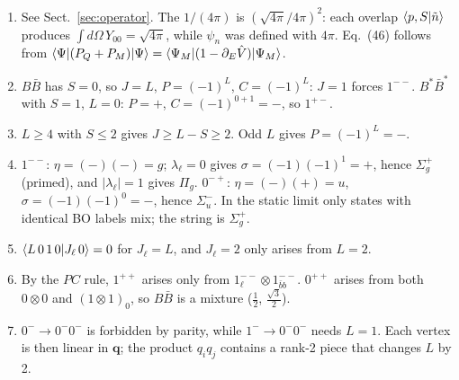 \documentclass[11pt,a4paper]{article}
\begin{document}
\begin{enumerate}
\item See Sect.~\ref{sec:operator}. The $1/(4\pi)$ is $(\sqrt{4\pi}/4\pi)^2$: each overlap $\braket{p,S|\tilde n}$ produces $\int d\Omega\,Y_{00}=\sqrt{4\pi}$, while $\psi_n$ was defined with $4\pi$. Eq.~(46) follows from $\braket{\Psi|(P_Q+P_M)|\Psi}=\braket{\Psi_M|(1-\partial_E\hat V)|\Psi_M}$.
\item $B\bar B$ has $S=0$, so $J=L$, $P=(-1)^L$, $C=(-1)^L$: $J=1$ forces $1^{--}$. $B^*\bar B^*$ with $S=1$, $L=0$: $P=+$, $C=(-1)^{0+1}=-$, so $1^{+-}$.
\item $L\ge4$ with $S\le2$ gives $J\ge L-S\ge2$. Odd $L$ gives $P=(-1)^L=-$.
\item $1^{--}$: $\eta=(-)(-)=g$; $\lambda_\ell=0$ gives $\sigma=(-1)(-1)^1=+$, hence $\Sigma_g^+$ (primed), and $|\lambda_\ell|=1$ gives $\Pi_g$. $0^{-+}$: $\eta=(-)(+)=u$, $\sigma=(-1)(-1)^0=-$, hence $\Sigma_u^-$. In the static limit only states with identical BO labels mix; the string is $\Sigma_g^+$.
\item $\braket{L\,0\,1\,0|J_\ell\,0}=0$ for $J_\ell=L$, and $J_\ell=2$ only arises from $L=2$.
\item By the $PC$ rule, $1^{++}$ arises only from $1_\ell^{--}\otimes1_{\bar bb}^{--}$. $0^{++}$ arises from both $0\otimes0$ and $(1\otimes1)_0$, so $B\bar B$ is a mixture ($\frac12$, $\frac{\sqrt3}{2}$).
\item $0^-\to0^-0^-$ is forbidden by parity, while $1^-\to0^-0^-$ needs $L=1$. Each vertex is then linear in $\bm q$; the product $q_iq_j$ contains a rank-2 piece that changes $L$ by 2.
\end{enumerate}
\end{document}
